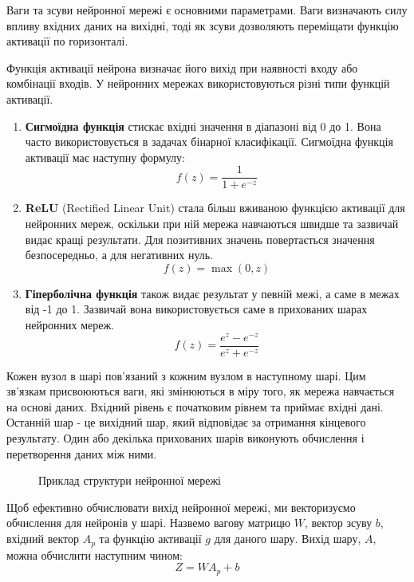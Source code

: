Ваги та зсуви нейронної мережі є основними параметрами. 
Ваги визначають силу впливу вхідних даних на вихідні, 
тоді як зсуви дозволяють переміщати функцію активації по горизонталі. 

Функція активації нейрона визначає його вихід при 
наявності входу або комбінації входів. 
У нейронних мережах використовуються різні 
типи функцій активації.

\begin{enumerate}
  \item \textbf{Сигмоїдна функція} стискає вхідні 
    значення в діапазоні від 0 до 1. 
    Вона часто використовується в задачах бінарної класифікації. 
    Сигмоїдна функція активації має наступну формулу:
    \[ f(z) = \frac{1}{1 + e^{-z}} \] 
  \item \textbf{ReLU} (Rectified Linear Unit) стала більш вживаною функцією
    активації для нейронних мереж, оскільки при ній мережа навчаються
    швидше та зазвичай видає кращі результати. Для позитивних значень повертається
    значення безпосередньо, а для негативних нуль.
    \[ f(z) = \max(0, z) \]
  \item \textbf{Гіперболічна функція} також видає результат у певній межі, а саме в межах від
    -1 до 1.
    Зазвичай вона використовується саме в прихованих шарах нейронних мереж.
    \[ f(z) = \frac{e^{z} - e^{-z}}{e^{z} + e^{-z}} \] 

\end{enumerate}

Кожен вузол в шарі пов'язаний з кожним вузлом в наступному шарі. 
Цим зв'язкам присвоюються ваги, які змінюються в міру того, 
як мережа навчається на основі даних.
Вхідний рівень є початковим рівнем та приймає вхідні дані.
Останній шар - це вихідний шар, який відповідає за отримання кінцевого результату. 
Один або декілька прихованих шарів виконують обчислення і перетворення даних між ними.

\begin{figure}[ht]
    \centering
    \caption{Приклад структури нейронної мережі}
    \label{fig:приклад-структури-нейронної-мережі}
\end{figure}

Щоб ефективно обчислювати вихід нейронної мережі, 
ми векторизуємо обчислення для нейронів у шарі. 
Назвемо вагову матрицю $W$, вектор зсуву $b$, 
вхідний вектор $A_p$ та функцію активації $g$ для даного шару. 
Вихід шару, $A$, можна обчислити наступним чином:
\[ Z = W A_{p} + b \] 


